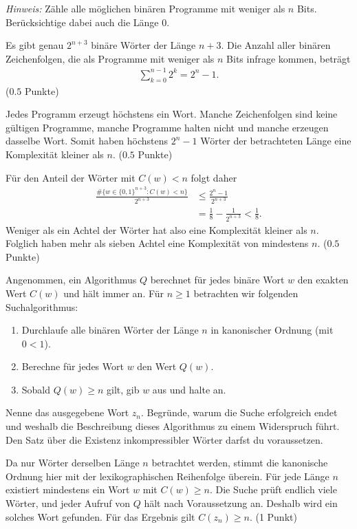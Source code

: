 \begin{questions}
	\textit{Hinweis:} Zähle alle möglichen binären Programme mit weniger als $n$ Bits. Berücksichtige dabei auch die Länge $0$.
	\begin{solution}
		Es gibt genau $2^{n+3}$ binäre Wörter der Länge $n+3$. Die Anzahl aller binären Zeichenfolgen, die als Programme mit weniger als $n$ Bits infrage kommen, beträgt
		\begin{align*}
			\sum_{k=0}^{n-1}2^k=2^n-1.
		\end{align*}
		($0.5$ Punkte)

		Jedes Programm erzeugt höchstens ein Wort. Manche Zeichenfolgen sind keine gültigen Programme, manche Programme halten nicht und manche erzeugen dasselbe Wort. Somit haben höchstens $2^n-1$ Wörter der betrachteten Länge eine Komplexität kleiner als $n$. ($0.5$ Punkte)

		Für den Anteil der Wörter mit $C(w)<n$ folgt daher
		\begin{align*}
			\frac{\#\{w\in\{0,1\}^{n+3}:C(w)<n\}}{2^{n+3}}
			&\leq\frac{2^n-1}{2^{n+3}}\\
			&=\frac18-\frac{1}{2^{n+3}}<\frac18.
		\end{align*}
		Weniger als ein Achtel der Wörter hat also eine Komplexität kleiner als $n$. Folglich haben mehr als sieben Achtel eine Komplexität von mindestens $n$. ($0.5$ Punkte)
	\end{solution}

	\question[3]
	Angenommen, ein Algorithmus $Q$ berechnet für jedes binäre Wort $w$ den exakten Wert $C(w)$ und hält immer an. Für $n\geq1$ betrachten wir folgenden Suchalgorithmus:
	\begin{enumerate}
		\item Durchlaufe alle binären Wörter der Länge $n$ in kanonischer Ordnung (mit $0<1$).
		\item Berechne für jedes Wort $w$ den Wert $Q(w)$.
		\item Sobald $Q(w)\geq n$ gilt, gib $w$ aus und halte an.
	\end{enumerate}
	Nenne das ausgegebene Wort $z_n$. Begründe, warum die Suche erfolgreich endet und weshalb die Beschreibung dieses Algorithmus zu einem Widerspruch führt. Den Satz über die Existenz inkompressibler Wörter darfst du voraussetzen.
	\begin{solution}
		Da nur Wörter derselben Länge $n$ betrachtet werden, stimmt die kanonische Ordnung hier mit der lexikographischen Reihenfolge überein. Für jede Länge $n$ existiert mindestens ein Wort $w$ mit $C(w)\geq n$. Die Suche prüft endlich viele Wörter, und jeder Aufruf von $Q$ hält nach Voraussetzung an. Deshalb wird ein solches Wort gefunden. Für das Ergebnis gilt $C(z_n)\geq n$. (1 Punkt)


\end{solution}
\end{questions}
